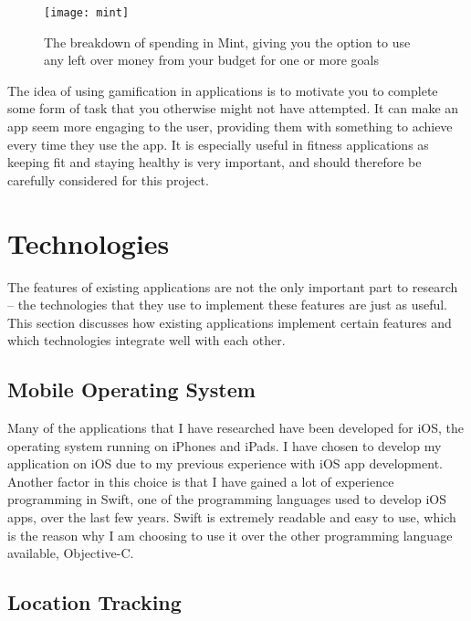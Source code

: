 \begin{figure}[hbt]
  \centering
  \texttt{[image: mint]}
  \caption{The breakdown of spending in Mint, giving you the option to use any left over money from your budget for one or more goals \cite{IntuitInc.a}}
  \label{fig:mint}
\end{figure}

The idea of using gamification in applications is to motivate you to complete some form of task that you otherwise might not have attempted. It can make an app seem more engaging to the user, providing them with something to achieve every time they use the app. It is especially useful in fitness applications as keeping fit and staying healthy is very important, and should therefore be carefully considered for this project.


\section{Technologies}

The features of existing applications are not the only important part to research -- the technologies that they use to implement these features are just as useful. This section discusses how existing applications implement certain features and which technologies integrate well with each other.

\subsection{Mobile Operating System}

Many of the applications that I have researched have been developed for iOS, the operating system running on iPhones and iPads. I have chosen to develop my application on iOS due to my previous experience with iOS app development. Another factor in this choice is that I have gained a lot of experience programming in Swift, one of the programming languages used to develop iOS apps, over the last few years. Swift is extremely readable and easy to use, which is the reason why I am choosing to use it over the other programming language available, Objective-C.

\subsection{Location Tracking}

